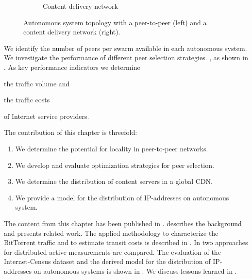 \begin{figure}[bt]
\begin{subfigure}[b]{0.54\textwidth}
    \vspace{-0.5cm}
    \caption{Content delivery network}
    \label{fig:aslevel:cdn}
	\end{subfigure}
\hspace{-0.5cm}
	\caption{Autonomous system topology with a peer-to-peer (left) and a content delivery network (right).}
\end{figure}

We identify the number of peers per swarm available in each autonomous system. We investigate the performance of different peer selection strategies. , as shown in .
As key performance indicators we determine
\begin{enumerate*}
\item the traffic volume and
\item the traffic costs
\end{enumerate*}
of Internet service providers.

The contribution of this chapter is threefold:
\begin{enumerate}
\item We determine the potential for locality in peer-to-peer networks.
\item We develop and evaluate optimization strategies for peer selection.
\item We determine the distribution of content servers in a global CDN.
\item We provide a model for the distribution of IP-addresses on autonomous system.
\end{enumerate}

The content from this chapter has been published in \cite{burger2012profit,burger2014vantage,burger2016hierarchical}.
 describes the background and presents related work.
The applied methodology to characterize the BitTorrent traffic and to estimate transit costs is described in .
In  two approaches for distributed active measurements are compared.
The evaluation of the Internet-Census dataset and the derived model for the distribution of IP-addresses on autonomous systems is shown in .
We discuss lessons learned in .






